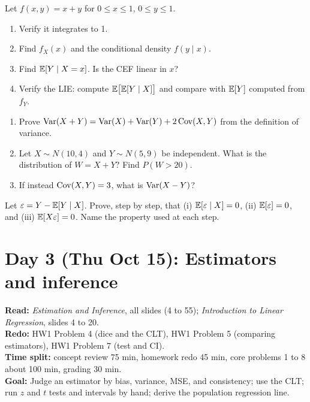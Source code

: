 \documentclass[11pt]{article}
\begin{document}
Let $f(x,y)=x+y$ for $0\le x\le 1$, $0\le y\le 1$.
\begin{enumerate}[label=(\alph*)]
  \item Verify it integrates to 1.
  \item Find $f_X(x)$ and the conditional density $f(y\mid x)$.
  \item Find $\mathbb{E}[Y\mid X=x]$. Is the CEF linear in $x$?
  \item Verify the LIE: compute $\mathbb{E}\big[\mathbb{E}[Y\mid X]\big]$ and compare with $\mathbb{E}[Y]$ computed from $f_Y$.
\end{enumerate}

\begin{enumerate}[label=(\alph*)]
  \item Prove $\operatorname{Var}(X+Y)=\operatorname{Var}(X)+\operatorname{Var}(Y)+2\operatorname{Cov}(X,Y)$ from the definition of variance.
  \item Let $X\sim N(10,4)$ and $Y\sim N(5,9)$ be independent. What is the distribution of $W=X+Y$? Find $P(W>20)$.
  \item If instead $\operatorname{Cov}(X,Y)=3$, what is $\operatorname{Var}(X-Y)$?
\end{enumerate}

Let $\varepsilon=Y-\mathbb{E}[Y\mid X]$. Prove, step by step, that (i) $\mathbb{E}[\varepsilon\mid X]=0$, (ii) $\mathbb{E}[\varepsilon]=0$, and (iii) $\mathbb{E}[X\varepsilon]=0$. Name the property used at each step.

\clearpage
\section{Day 3 (Thu Oct 15): Estimators and inference}

\begin{planbox}
\textbf{Read:} \emph{Estimation and Inference}, all slides (4 to 55); \emph{Introduction to Linear Regression}, slides 4 to 20.\\
\textbf{Redo:} HW1 Problem 4 (dice and the CLT), HW1 Problem 5 (comparing estimators), HW1 Problem 7 (test and CI).\\
\textbf{Time split:} concept review 75 min, homework redo 45 min, core problems 1 to 8 about 100 min, grading 30 min.\\
\textbf{Goal:} Judge an estimator by bias, variance, MSE, and consistency; use the CLT; run $z$ and $t$ tests and intervals by hand; derive the population regression line.
\end{planbox}
\end{document}
